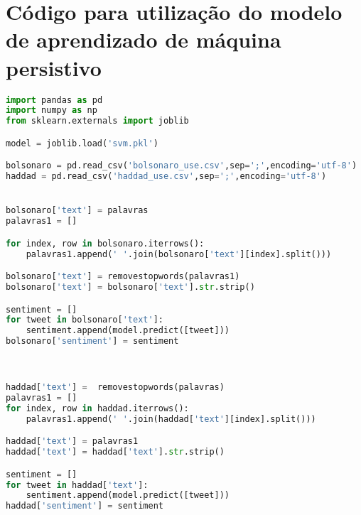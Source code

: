\section{Código para utilização do modelo de aprendizado de máquina persistivo}
\label{cod:geo}
\begin{lstlisting}[language=Python]
import pandas as pd
import numpy as np
from sklearn.externals import joblib

model = joblib.load('svm.pkl')

bolsonaro = pd.read_csv('bolsonaro_use.csv',sep=';',encoding='utf-8')
haddad = pd.read_csv('haddad_use.csv',sep=';',encoding='utf-8')


bolsonaro['text'] = palavras
palavras1 = []

for index, row in bolsonaro.iterrows():
    palavras1.append(' '.join(bolsonaro['text'][index].split()))

bolsonaro['text'] = removestopwords(palavras1)
bolsonaro['text'] = bolsonaro['text'].str.strip()

sentiment = []
for tweet in bolsonaro['text']:
    sentiment.append(model.predict([tweet]))
bolsonaro['sentiment'] = sentiment



haddad['text'] =  removestopwords(palavras)
palavras1 = []
for index, row in haddad.iterrows():
    palavras1.append(' '.join(haddad['text'][index].split()))

haddad['text'] = palavras1
haddad['text'] = haddad['text'].str.strip()

sentiment = []
for tweet in haddad['text']:
    sentiment.append(model.predict([tweet]))
haddad['sentiment'] = sentiment

    
\end{lstlisting}